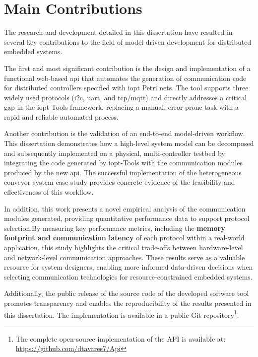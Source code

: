 \section{Main Contributions}
\label{sec:main_contributions}

The research and development detailed in this dissertation have resulted in several key contributions to the field of model-driven development for distributed embedded systems. 

The first and most significant contribution is the design and implementation of a functional web-based \gls{api} that automates the generation of communication code for distributed controllers specified with \gls{iopt} Petri nets. The tool supports three widely used protocols (\gls{i2c}, \gls{uart}, and \gls{tcp}/\gls{mqtt}) and directly addresses a critical gap in the \gls{iopt}-Tools framework, replacing a manual, error-prone task with a rapid and reliable automated process.

Another contribution is the validation of an end-to-end model-driven workflow. This dissertation demonstrates how a high-level system model can be decomposed and subsequently implemented on a physical, multi-controller testbed by integrating the code generated by \gls{iopt}-Tools with the communication modules produced by the new \gls{api}. The successful implementation of the heterogeneous conveyor system case study provides concrete evidence of the feasibility and effectiveness of this workflow.

In addition, this work presents a novel empirical analysis of the communication modules generated, providing quantitative performance data to support protocol selection.By measuring key performance metrics, including the \textbf{memory footprint and communication latency}  of each protocol within a real-world application, this study highlights the critical trade-offs between hardware-level and network-level communication approaches. These results serve as a valuable resource for system designers, enabling more informed data-driven decisions when selecting communication technologies for resource-constrained embedded systems.

Additionally, the public release of the source code of the developed software tool promotes transparency and enables the reproducibility of the results presented in this dissertation. The implementation is available in a public Git repository\footnote{The complete open-source implementation of the API is available at: \url{https://github.com/dtavares7/Api}}.

